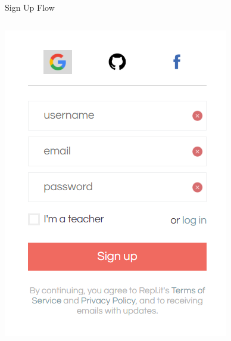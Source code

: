		\begin{frame}{Sign Up Flow}
		
		\begin{columns}
			\pause
			\begin{column}{0.33\textwidth}
				\centering
				\includegraphics[width=\textwidth]{images/replit_gauth1.png}
			\end{column}
			\pause
			\begin{column}{0.33\textwidth}
				\centering

\end{column}
\end{columns}
\end{frame}
